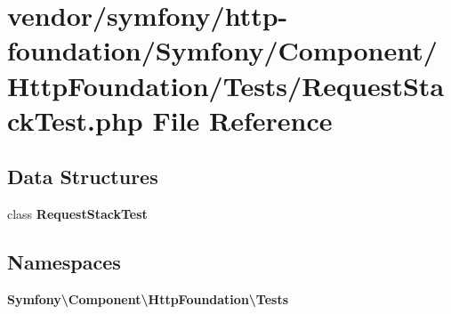 \section{vendor/symfony/http-\/foundation/\+Symfony/\+Component/\+Http\+Foundation/\+Tests/\+Request\+Stack\+Test.php File Reference}
\label{_request_stack_test_8php}
\subsection*{Data Structures}
\begin{DoxyCompactItemize}
\item 
class {\bf Request\+Stack\+Test}
\end{DoxyCompactItemize}
\subsection*{Namespaces}
\begin{DoxyCompactItemize}
\item 
 {\bf Symfony\textbackslash{}\+Component\textbackslash{}\+Http\+Foundation\textbackslash{}\+Tests}
\end{DoxyCompactItemize}
